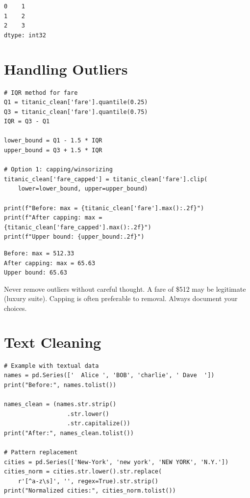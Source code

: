 \begin{codeoutput}
\begin{verbatim}
0    1
1    2
2    3
dtype: int32
\end{verbatim}
\end{codeoutput}

\section{Handling Outliers}

\begin{codeblock}[title=\textbf{Python}]
\begin{verbatim}
# IQR method for fare
Q1 = titanic_clean['fare'].quantile(0.25)
Q3 = titanic_clean['fare'].quantile(0.75)
IQR = Q3 - Q1

lower_bound = Q1 - 1.5 * IQR
upper_bound = Q3 + 1.5 * IQR

# Option 1: capping/winsorizing
titanic_clean['fare_capped'] = titanic_clean['fare'].clip(
    lower=lower_bound, upper=upper_bound)

print(f"Before: max = {titanic_clean['fare'].max():.2f}")
print(f"After capping: max = {titanic_clean['fare_capped'].max():.2f}")
print(f"Upper bound: {upper_bound:.2f}")
\end{verbatim}
\end{codeblock}

\begin{codeoutput}
\begin{verbatim}
Before: max = 512.33
After capping: max = 65.63
Upper bound: 65.63
\end{verbatim}
\end{codeoutput}

\begin{warning}
Never remove outliers without careful thought. A fare of \$512 may be legitimate (luxury suite). Capping is often preferable to removal. Always document your choices.
\end{warning}

\section{Text Cleaning}

\begin{codeblock}[title=\textbf{Python}]
\begin{verbatim}
# Example with textual data
names = pd.Series(['  Alice ', 'BOB', 'charlie', ' Dave  '])
print("Before:", names.tolist())

names_clean = (names.str.strip()
                  .str.lower()
                  .str.capitalize())
print("After:", names_clean.tolist())

# Pattern replacement
cities = pd.Series(['New-York', 'new york', 'NEW YORK', 'N.Y.'])
cities_norm = cities.str.lower().str.replace(
    r'[^a-z\s]', '', regex=True).str.strip()
print("Normalized cities:", cities_norm.tolist())
\end{verbatim}
\end{codeblock}

